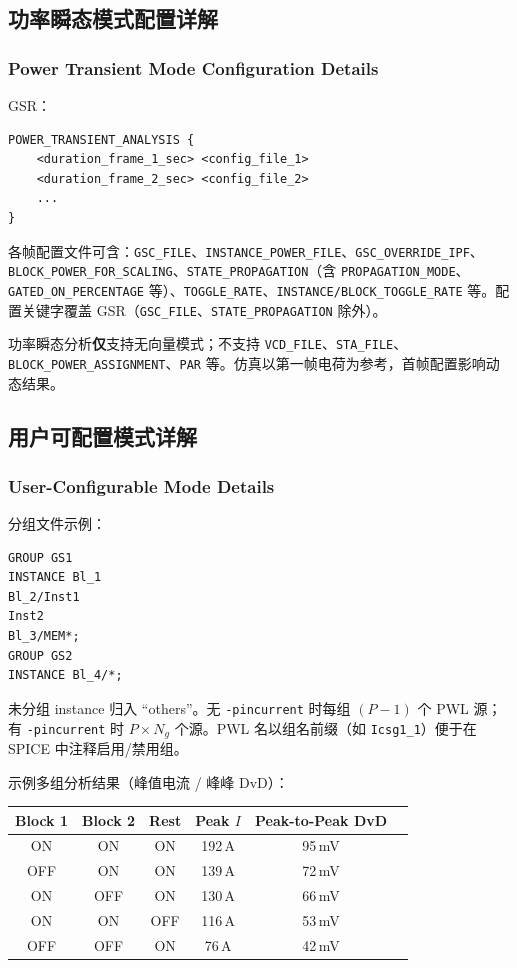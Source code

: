 
\subsection{功率瞬态模式配置详解}
\subsubsection*{Power Transient Mode Configuration Details}

GSR：
\begin{lstlisting}
POWER_TRANSIENT_ANALYSIS {
    <duration_frame_1_sec> <config_file_1>
    <duration_frame_2_sec> <config_file_2>
    ...
}
\end{lstlisting}

各帧配置文件可含：\texttt{GSC\_FILE}、\texttt{INSTANCE\_POWER\_FILE}、\texttt{GSC\_OVERRIDE\_IPF}、\texttt{BLOCK\_POWER\_FOR\_SCALING}、\texttt{STATE\_PROPAGATION}（含 \texttt{PROPAGATION\_MODE}、\texttt{GATED\_ON\_PERCENTAGE} 等）、\texttt{TOGGLE\_RATE}、\texttt{INSTANCE/BLOCK\_TOGGLE\_RATE} 等。配置关键字覆盖 GSR（\texttt{GSC\_FILE}、\texttt{STATE\_PROPAGATION} 除外）。

\begin{noteBox}
功率瞬态分析\textbf{仅}支持无向量模式；不支持 \texttt{VCD\_FILE}、\texttt{STA\_FILE}、\texttt{BLOCK\_POWER\_ASSIGNMENT}、\texttt{PAR} 等。仿真以第一帧电荷为参考，首帧配置影响动态结果。
\end{noteBox}

\subsection{用户可配置模式详解}
\subsubsection*{User-Configurable Mode Details}

分组文件示例：
\begin{lstlisting}
GROUP GS1
INSTANCE Bl_1
Bl_2/Inst1
Inst2
Bl_3/MEM*;
GROUP GS2
INSTANCE Bl_4/*;
\end{lstlisting}

未分组 instance 归入 ``others''。无 \texttt{-pincurrent} 时每组 $(P-1)$ 个 PWL 源；有 \texttt{-pincurrent} 时 $P \times N_g$ 个源。PWL 名以组名前缀（如 \texttt{Icsg1\_1}）便于在 SPICE 中注释启用/禁用组。

示例多组分析结果（峰值电流 / 峰峰 DvD）：
\begin{center}
\small
\begin{tabular}{cccccc}
\toprule
Block 1 & Block 2 & Rest & Peak $I$ & Peak-to-Peak DvD \\
\midrule
ON & ON & ON & 192\,A & 95\,mV \\
OFF & ON & ON & 139\,A & 72\,mV \\
ON & OFF & ON & 130\,A & 66\,mV \\
ON & ON & OFF & 116\,A & 53\,mV \\
OFF & OFF & ON & 76\,A & 42\,mV \\
\bottomrule
\end{tabular}
\end{center}


